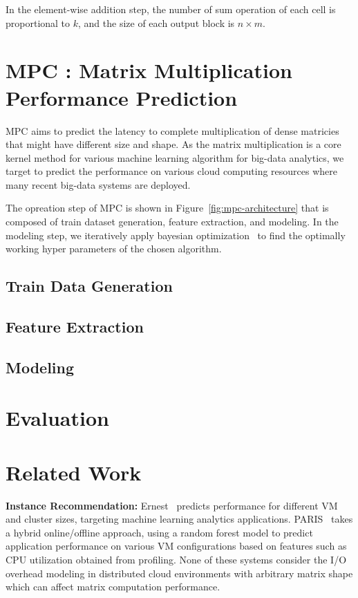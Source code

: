 \documentclass[10pt, conference, compsocconf]{IEEEtran}
\begin{document}
In the element-wise addition step, the number of sum operation of each cell is proportional to $k$, and the size of each output block is $n \times m$.

\section{MPC : Matrix Multiplication Performance Prediction}
MPC aims to predict the latency to complete multiplication of dense matricies that might have different size and shape. As the matrix multiplication is a core kernel method for various machine learning algorithm for big-data analytics, we target to predict the performance on various cloud computing resources where many recent big-data systems are deployed.


The opreation step of MPC is shown in Figure~\ref{fig:mpc-architecture} that is composed of train dataset generation, feature extraction, and modeling. In the modeling step, we iteratively apply bayesian optimization~\cite{bayesian-optimization} to find the optimally working hyper parameters of the chosen algorithm.

\subsection{Train Data Generation}
\subsection{Feature Extraction}
\subsection{Modeling}




\section{Evaluation}{\label{eval}}

\section{Related Work}\label{sec:relatedwork}
\textbf{Instance Recommendation:} Ernest~\cite{ernest} predicts performance for different VM and cluster sizes, targeting machine learning analytics applications. PARIS~\cite{Yadwadkar:2017:SBV:3127479.3131614} takes a hybrid online/offline approach, using a random forest model to predict application performance on various VM configurations based on features such as CPU utilization obtained from profiling. None of these systems consider the I/O overhead modeling in distributed cloud environments with arbitrary matrix shape which can affect matrix computation performance. 
\end{document}
